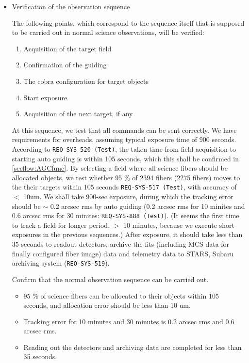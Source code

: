 \begin{itemize}

\item{Verification of the observation sequence}

The following points, which correspond to the sequence itself that is supposed to be carried out in normal science observations, will be verified:

\begin{enumerate}
\item{Acquisition of the target field}
\item{Confirmation of the guiding}
\item{The cobra configuration for target objects}
\item{Start exposure}
\item{Acquisition of the next target, if any}
\end{enumerate}

At this sequence, we test that all commands can be sent correctly.
We have requirements for overheads, assuming typical exposure time of 900 seconds.
According to {\tt REQ-SYS-520 (Test)}, the taken time from field acquisition to starting auto guiding is within 105 seconds, which this shall be confirmed in \ref{secflow:AGCfunc}.
By selecting a field where all science fibers should be allocated objects, we test whether 95 \% of 2394 fibers (2275 fibers) moves to the their targets within 105 seconds {\tt REQ-SYS-517 (Test)}, with accuracy of $<$ 10um. 
We shall take 900-sec exposure, during which the tracking error should be $\sim$ 0.2 arcsec rms by auto guiding (0.2 arcsec rms for 10 minites and 0.6 arcsec rms for 30 minites: {\tt REQ-SYS-888 (Test)}).
(It seems the first time to track a field for longer period, $>$ 10 minutes, because we execute short exposures in the previous sequences.)
After exposure, it should take less than 35 seconds to readout detectors, archive the fits (including MCS data for finally configured fiber image) data and telemetry data to STARS, Subaru archiving system ({\tt REQ-SYS-519}). 


\begin{itembox}[l]{}
Confirm that the normal observation sequence can be carried out.
\begin{itemize}
\item 95 \% of science fibers can be allocated to their objects within 105 seconds, and allocation error should be less than 10 um. 
\item Tracking error for 10 minutes and 30 minutes is 0.2 arcsec rms and 0.6 arcsec rms. 
\item Reading out the detectors and archiving data are completed for less than 35 seconds. 
\end{itemize}
\end{itembox}


\end{itemize}
